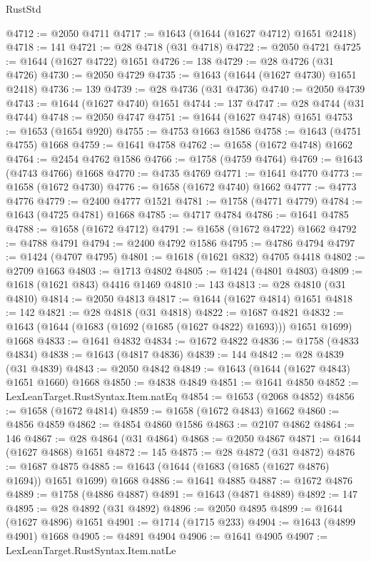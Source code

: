 \begin{lexlean}{RustStd}
\begin{coremodule}
@4712 := @2050 @4711
@4717 := @1643 (@1644 (@1627 @4712) @1651 @2418)
@4718 := 141
@4721 := @28 @4718 (@31 @4718)
@4722 := @2050 @4721
@4725 := @1644 (@1627 @4722) @1651
@4726 := 138
@4729 := @28 @4726 (@31 @4726)
@4730 := @2050 @4729
@4735 := @1643 (@1644 (@1627 @4730) @1651 @2418)
@4736 := 139
@4739 := @28 @4736 (@31 @4736)
@4740 := @2050 @4739
@4743 := @1644 (@1627 @4740) @1651
@4744 := 137
@4747 := @28 @4744 (@31 @4744)
@4748 := @2050 @4747
@4751 := @1644 (@1627 @4748) @1651
@4753 := @1653 (@1654 @920)
@4755 := @4753 @1663 @1586
@4758 := @1643 (@4751 @4755) @1668
@4759 := @1641 @4758
@4762 := @1658 (@1672 @4748) @1662
@4764 := @2454 @4762 @1586
@4766 := @1758 (@4759 @4764)
@4769 := @1643 (@4743 @4766) @1668
@4770 := @4735 @4769
@4771 := @1641 @4770
@4773 := @1658 (@1672 @4730)
@4776 := @1658 (@1672 @4740) @1662
@4777 := @4773 @4776
@4779 := @2400 @4777 @1521
@4781 := @1758 (@4771 @4779)
@4784 := @1643 (@4725 @4781) @1668
@4785 := @4717 @4784
@4786 := @1641 @4785
@4788 := @1658 (@1672 @4712)
@4791 := @1658 (@1672 @4722) @1662
@4792 := @4788 @4791
@4794 := @2400 @4792 @1586
@4795 := @4786 @4794
@4797 := @1424 (@4707 @4795)
@4801 := @1618 (@1621 @832) @4705 @4418
@4802 := @2709 @1663
@4803 := @1713 @4802
@4805 := @1424 (@4801 @4803)
@4809 := @1618 (@1621 @843) @4416 @1469
@4810 := 143
@4813 := @28 @4810 (@31 @4810)
@4814 := @2050 @4813
@4817 := @1644 (@1627 @4814) @1651
@4818 := 142
@4821 := @28 @4818 (@31 @4818)
@4822 := @1687 @4821
@4832 := @1643 (@1644 (@1683 (@1692 (@1685 (@1627 @4822) @1693))) @1651 @1699) @1668
@4833 := @1641 @4832
@4834 := @1672 @4822
@4836 := @1758 (@4833 @4834)
@4838 := @1643 (@4817 @4836)
@4839 := 144
@4842 := @28 @4839 (@31 @4839)
@4843 := @2050 @4842
@4849 := @1643 (@1644 (@1627 @4843) @1651 @1660) @1668
@4850 := @4838 @4849
@4851 := @1641 @4850
@4852 := LexLeanTarget.RustSyntax.Item.natEq
@4854 := @1653 (@2068 @4852)
@4856 := @1658 (@1672 @4814)
@4859 := @1658 (@1672 @4843) @1662
@4860 := @4856 @4859
@4862 := @4854 @4860 @1586
@4863 := @2107 @4862
@4864 := 146
@4867 := @28 @4864 (@31 @4864)
@4868 := @2050 @4867
@4871 := @1644 (@1627 @4868) @1651
@4872 := 145
@4875 := @28 @4872 (@31 @4872)
@4876 := @1687 @4875
@4885 := @1643 (@1644 (@1683 (@1685 (@1627 @4876) @1694)) @1651 @1699) @1668
@4886 := @1641 @4885
@4887 := @1672 @4876
@4889 := @1758 (@4886 @4887)
@4891 := @1643 (@4871 @4889)
@4892 := 147
@4895 := @28 @4892 (@31 @4892)
@4896 := @2050 @4895
@4899 := @1644 (@1627 @4896) @1651
@4901 := @1714 (@1715 @233)
@4904 := @1643 (@4899 @4901) @1668
@4905 := @4891 @4904
@4906 := @1641 @4905
@4907 := LexLeanTarget.RustSyntax.Item.natLe

\end{coremodule}
\end{lexlean}

